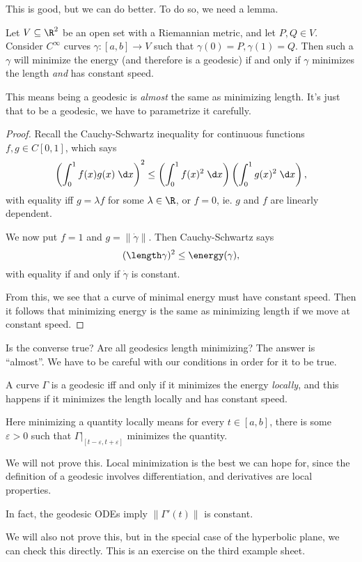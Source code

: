 \documentclass[a4paper]{article}
\begin{document}
This is good, but we can do better. To do so, we need a lemma.

\begin{lemma}
  Let $V \subseteq \R^2$ be an open set with a Riemannian metric, and let $P, Q \in V$. Consider $C^\infty$ curves $\gamma: [a, b] \to V$ such that $\gamma(0) = P, \gamma(1) = Q$. Then such a $\gamma$ will minimize the energy (and therefore is a geodesic) if and only if $\gamma$ minimizes the length \emph{and} has constant speed.
\end{lemma}
This means being a geodesic is \emph{almost} the same as minimizing length. It's just that to be a geodesic, we have to parametrize it carefully.

\begin{proof}
  Recall the Cauchy-Schwartz inequality for continuous functions $f, g \in C[0,1]$, which says
  \[
    \left(\int_0^1 f(x)g(x)\;\d x\right)^2 \leq \left(\int_0^1 f(x)^2\;\d x\right)\left(\int_0^1 g(x)^2\;\d x\right),
  \]
  with equality iff $g = \lambda f$ for some $\lambda \in \R$, or $f = 0$, ie. $g$ and $f$ are linearly dependent.

  We now put $f = 1$ and $g = \|\dot{\gamma}\|$. Then Cauchy-Schwartz says
  \[
    (\length \gamma)^2 \leq \energy(\gamma),
  \]
  with equality if and only if $\dot{\gamma}$ is constant.

  From this, we see that a curve of minimal energy must have constant speed. Then it follows that minimizing energy is the same as minimizing length if we move at constant speed.
\end{proof}

Is the converse true? Are all geodesics length minimizing? The answer is ``almost''. We have to be careful with our conditions in order for it to be true.
\begin{prop}
  A curve $\Gamma$ is a geodesic iff and only if it minimizes the energy \emph{locally}, and this happens if it minimizes the length locally and has constant speed.

  Here minimizing a quantity locally means for every $t \in [a, b]$, there is some $\varepsilon > 0$ such that $\Gamma|_{[t - \varepsilon, t + \varepsilon]}$ minimizes the quantity.
\end{prop}
We will not prove this. Local minimization is the best we can hope for, since the definition of a geodesic involves differentiation, and derivatives are local properties.

\begin{prop}
  In fact, the geodesic ODEs imply $\|\Gamma'(t)\|$ is constant.
\end{prop}
We will also not prove this, but in the special case of the hyperbolic plane, we can check this directly. This is an exercise on the third example sheet.
\end{document}
